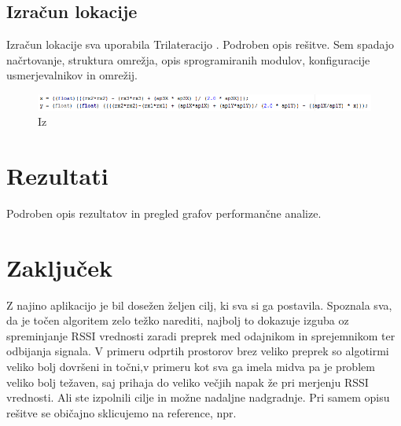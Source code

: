 \documentclass[11pt,a4paper,slovene]{article}
\begin{document}
\subsection{Izračun lokacije}
Izračun lokacije sva uporabila Trilateracijo \cite{trilateration}.
Podroben opis rešitve. Sem spadajo načrtovanje, struktura omrežja, opis sprogramiranih modulov, konfiguracije usmerjevalnikov in omrežij.

\begin{figure}[htb]
\centering
\includegraphics[scale=0.15]{slike/trilinerationCalculation.png}
\caption{Iz}
\end{figure}

\section{Rezultati}
Podroben opis rezultatov in pregled grafov performančne analize.

\section{Zaključek}
Z najino aplikacijo je bil dosežen željen cilj, ki sva si ga postavila. Spoznala sva, da je točen algoritem zelo težko narediti, najbolj to dokazuje izguba oz spreminjanje RSSI vrednosti zaradi preprek med odajnikom in sprejemnikom ter odbijanja signala. V primeru odprtih prostorov brez veliko preprek so algotirmi veliko bolj dovršeni in točni,v primeru kot sva ga imela midva pa je problem veliko bolj težaven, saj prihaja do veliko večjih napak že pri merjenju RSSI vrednosti.
Ali ste izpolnili cilje in možne nadaljne nadgradnje. Pri samem opisu rešitve se običajno sklicujemo na reference, npr.

\pagebreak


\end{document}
